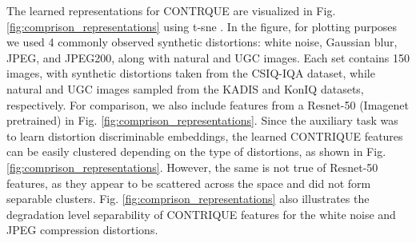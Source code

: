 \documentclass[journal]{IEEEtran}
\begin{document}
The learned representations for CONTRQUE are visualized in Fig. \ref{fig:comprison_representations} using t-sne \cite{van2008visualizing}. In the figure, for plotting purposes we used 4 commonly observed synthetic distortions: white noise, Gaussian blur, JPEG, and JPEG200, along with natural and UGC images. Each set contains 150 images, with synthetic distortions taken from the CSIQ-IQA dataset, while natural and UGC images sampled from the KADIS and KonIQ datasets, respectively. For comparison, we also include features from a Resnet-50 (Imagenet pretrained) in Fig. \ref{fig:comprison_representations}. Since the auxiliary task was to learn distortion discriminable embeddings, the learned CONTRIQUE features can be easily clustered depending on the type of distortions, as shown in Fig. \ref{fig:comprison_representations}. However, the same is not true of Resnet-50 features, as they appear to be scattered across the space and did not form separable clusters. Fig. \ref{fig:comprison_representations} also illustrates the degradation level separability of CONTRIQUE features for the white noise and JPEG compression distortions.
\end{document}
